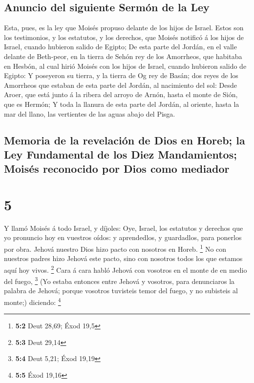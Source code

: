 \hypertarget{anuncio-del-siguiente-sermuxf3n-de-la-ley}{%
\subsection{Anuncio del siguiente Sermón de la
Ley}\label{anuncio-del-siguiente-sermuxf3n-de-la-ley}}

 Esta, pues, es la ley que Moisés propuso delante de los
hijos de Israel.  Estos son los testimonios, y los
estatutos, y los derechos, que Moisés notificó á los hijos de Israel,
cuando hubieron salido de Egipto;  De esta parte del
Jordán, en el valle delante de Beth-peor, en la tierra de Sehón rey de
los Amorrheos, que habitaba en Hesbón, al cual hirió Moisés con los
hijos de Israel, cuando hubieron salido de Egipto:  Y
poseyeron su tierra, y la tierra de Og rey de Basán; dos reyes de los
Amorrheos que estaban de esta parte del Jordán, al nacimiento del sol:
 Desde Aroer, que está junto á la ribera del arroyo de
Arnón, hasta el monte de Sión, que es Hermón;  Y toda la
llanura de esta parte del Jordán, al oriente, hasta la mar del llano,
las vertientes de las aguas abajo del Pisga.

\hypertarget{memoria-de-la-revelaciuxf3n-de-dios-en-horeb-la-ley-fundamental-de-los-diez-mandamientos-moisuxe9s-reconocido-por-dios-como-mediador}{%
\subsection{Memoria de la revelación de Dios en Horeb; la Ley
Fundamental de los Diez Mandamientos; Moisés reconocido por Dios como
mediador}\label{memoria-de-la-revelaciuxf3n-de-dios-en-horeb-la-ley-fundamental-de-los-diez-mandamientos-moisuxe9s-reconocido-por-dios-como-mediador}}

\hypertarget{section-4}{%
\section{5}\label{section-4}}

 Y llamó Moisés á todo Israel, y díjoles: Oye, Israel, los
estatutos y derechos que yo pronuncio hoy en vuestros oídos: y
aprendedlos, y guardadlos, para ponerlos por obra.  Jehová
nuestro Dios hizo pacto con nosotros en Horeb. \footnote{\textbf{5:2}
  Deut 28,69; Éxod 19,5}  No con nuestros padres hizo
Jehová este pacto, sino con nosotros todos los que estamos aquí hoy
vivos. \footnote{\textbf{5:3} Deut 29,14}  Cara á cara
habló Jehová con vosotros en el monte de en medio del fuego, \footnote{\textbf{5:4}
  Deut 5,21; Éxod 19,19}  (Yo estaba entonces entre Jehová
y vosotros, para denunciaros la palabra de Jehová; porque vosotros
tuvisteis temor del fuego, y no subisteis al monte;) diciendo:
\footnote{\textbf{5:5} Éxod 19,16}


